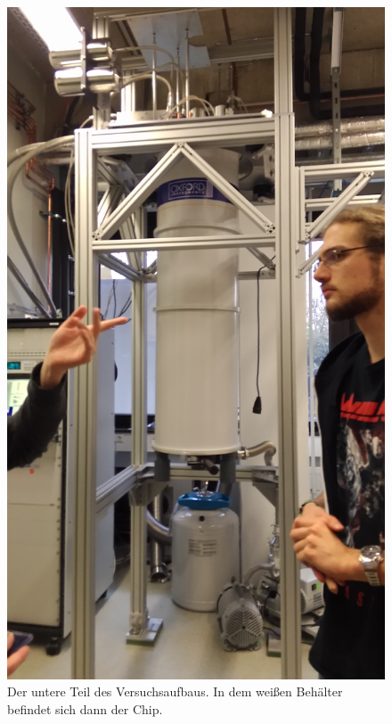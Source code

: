 \documentclass[DIN, pagenumber=false, fontsize=11pt]{scrartcl}
\begin{document}
\begin{figure}[h]
\begin{center}
 \includegraphics[width=\textheight,angle=270]{pictures/P_20150225_143154.jpg} \qquad
 \caption{Der untere Teil des Versuchsaufbaus. In dem weißen Behälter befindet sich dann der Chip.}
\end{center}
\end{figure}          
\end{document}
